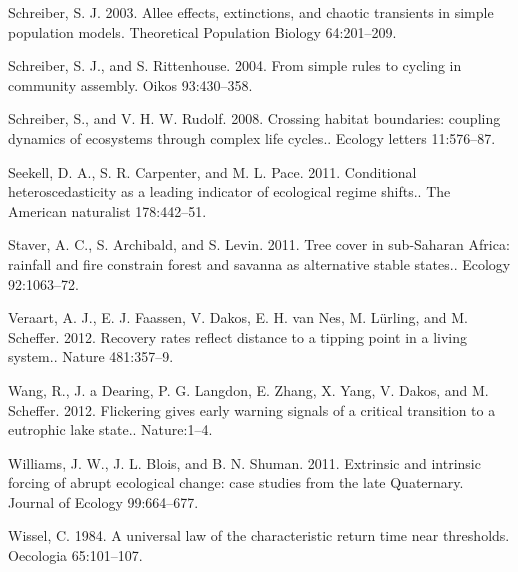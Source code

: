 \documentclass{article}
\begin{document}
Schreiber, S. J. 2003. Allee effects, extinctions, and chaotic
transients in simple population models. Theoretical Population Biology
64:201--209.

Schreiber, S. J., and S. Rittenhouse. 2004. From simple rules to cycling
in community assembly. Oikos 93:430--358.

Schreiber, S., and V. H. W. Rudolf. 2008. Crossing habitat boundaries:
coupling dynamics of ecosystems through complex life cycles.. Ecology
letters 11:576--87.

Seekell, D. A., S. R. Carpenter, and M. L. Pace. 2011. Conditional
heteroscedasticity as a leading indicator of ecological regime shifts..
The American naturalist 178:442--51.

Staver, A. C., S. Archibald, and S. Levin. 2011. Tree cover in
sub-Saharan Africa: rainfall and fire constrain forest and savanna as
alternative stable states.. Ecology 92:1063--72.

Veraart, A. J., E. J. Faassen, V. Dakos, E. H. van Nes, M. Lürling, and
M. Scheffer. 2012. Recovery rates reflect distance to a tipping point in
a living system.. Nature 481:357--9.

Wang, R., J. a Dearing, P. G. Langdon, E. Zhang, X. Yang, V. Dakos, and
M. Scheffer. 2012. Flickering gives early warning signals of a critical
transition to a eutrophic lake state.. Nature:1--4.

Williams, J. W., J. L. Blois, and B. N. Shuman. 2011. Extrinsic and
intrinsic forcing of abrupt ecological change: case studies from the
late Quaternary. Journal of Ecology 99:664--677.

Wissel, C. 1984. A universal law of the characteristic return time near
thresholds. Oecologia 65:101--107.
\end{document}
